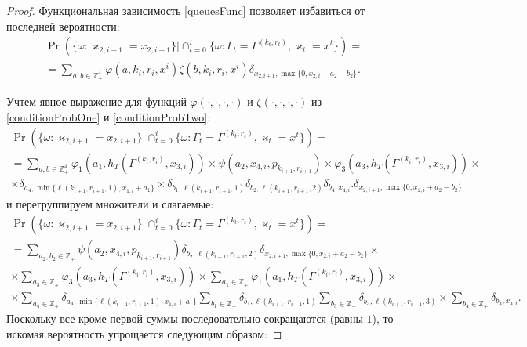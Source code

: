 \documentclass[a4paper,12pt,russian]{extarticle}
\begin{document}
\begin{proof}
Функциональная зависимость \eqref{queuesFunc} позволяет избавиться от последней вероятности:
\begin{multline*}
\Pr (\{ \omega \colon \varkappa_{2,i+1} = x_{2,i+1}\} |\cap_{t=0}^{i}\{\omega\colon \Gamma_t=\Gamma^{(k_t,r_t)}, \varkappa_t=x^t\}) =\\
=\sum_{a,b\in \mathbb{Z}_+^4} \varphi(a,k_i,r_i,x^i)\zeta(b,k_i,r_i,x^i)  \delta_{x_{2,i+1},\max\{0,x_{2,i}+a_2-b_2\}}.
\end{multline*}

Учтем явное выражение для функций $\varphi(\cdot, \cdot, \cdot, \cdot)$ и $\zeta(\cdot, \cdot, \cdot, \cdot)$ из \eqref{conditionProbOne} и \eqref{conditionProbTwo}:
\begin{multline*}
\Pr (\{ \omega \colon \varkappa_{2,i+1} = x_{2,i+1}\} |\cap_{t=0}^{i}\{\omega\colon \Gamma_t=\Gamma^{(k_t,r_t)}, \varkappa_t=x^t\}) =\\
=  \sum_{a,b\in \mathbb{Z}_+^4} \varphi_1(a_1,h_T(\Gamma^{(k_i,r_i)},x_{3,i})) \times \psi(a_2,x_{4,i}, p_{k_{i+1},r_{i+1}})  \times \varphi_3(a_3,h_T(\Gamma^{(k_i,r_i)},x_{3,i})) \times \\ \times \delta_{a_4,\min{\{\ell(k_{i+1},r_{i+1},1), x_{1,i}+a_1}\}} \times \delta_{b_1,\ell(k_{i+1},r_{i+1},1)} \delta_{b_2,\ell(k_{i+1},r_{i+1},2)} 
\delta_{b_4,x_{4,i}}. \delta_{x_{2,i+1},\max\{0,x_{2,i}+a_2-b_2\}} 
\end{multline*}
и перегруппируем множители и слагаемые:
\begin{multline*}
\Pr (\{ \omega \colon \varkappa_{2,i+1} = x_{2,i+1}\} |\cap_{t=0}^{i}\{\omega\colon \Gamma_t=\Gamma^{(k_t,r_t)}, \varkappa_t=x^t\}) =\\
= \sum_{a_2,b_2\in \mathbb{Z}_+}\psi(a_2,x_{4,i}, p_{k_{i+1},r_{i+1}})  \delta_{b_2,\ell(k_{i+1},r_{i+1},2)}   \delta_{x_{2,i+1},\max\{0,x_{2,i}+a_2-b_2\}} \times \\ 
\times \sum_{a_3\in \mathbb{Z}_+} \varphi_3(a_3,h_T(\Gamma^{(k_i,r_i)},x_{3,i})) \times \sum_{a_1\in \mathbb{Z}_+} \varphi_1(a_1,h_T(\Gamma^{(k_i,r_i)},x_{3,i})) \times \\ 
\times \sum_{a_4\in \mathbb{Z}_+} \delta_{a_4,\min{\{\ell(k_{i+1},r_{i+1},1), x_{1,i}+a_1}\}} \sum_{b_1\in \mathbb{Z}_+} \delta_{b_1,\ell(k_{i+1},r_{i+1},1)} \sum_{b_3\in \mathbb{Z}_+} \delta_{b_3,\ell(k_{i+1},r_{i+1},3)} 
\times \sum_{b_4\in \mathbb{Z}_+}  \delta_{b_4,x_{4,i}}.
\end{multline*}
Поскольку все кроме первой суммы последовательно сокращаются (равны $1$), то искомая вероятность упрощается следующим образом:

\end{proof}
\end{document}
